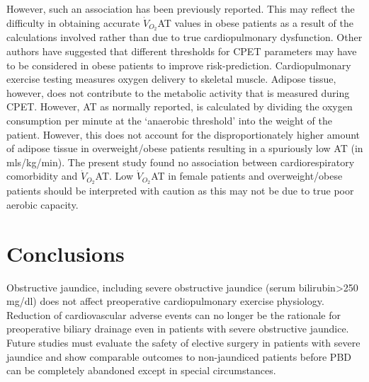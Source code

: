 However, such an association has been previously reported.\parencite{horwich_relationship_2009}  This may reflect the difficulty in obtaining accurate $\dot{V}_{O_2}$AT values in obese patients as a result of the calculations involved rather than due to true cardiopulmonary dysfunction. Other authors have suggested that different thresholds for CPET parameters may have to be considered in obese patients to improve risk-prediction.\parencite{donnelly_criteria_1990,hulens_exercise_2001} Cardiopulmonary exercise testing measures oxygen delivery to skeletal muscle. Adipose tissue, however, does not contribute to the metabolic activity that is measured during CPET. However, AT as normally reported, is calculated by dividing the oxygen consumption per minute at the ‘anaerobic threshold' into the weight of the patient. However, this does not account for the disproportionately higher amount of adipose tissue in overweight/obese patients resulting in a spuriously low AT (in mls/kg/min). The present study found no association between cardiorespiratory comorbidity and $\dot{V}_{O_2}$AT. Low $\dot{V}_{O_2}$AT in female patients and overweight/obese patients should be interpreted with caution as this may not be due to true poor aerobic capacity.

\section{Conclusions}
Obstructive jaundice, including severe obstructive jaundice (serum bilirubin>250 mg/dl) does not affect preoperative cardiopulmonary exercise physiology. Reduction of cardiovascular adverse events can no longer be the rationale for preoperative biliary drainage even in patients with severe obstructive jaundice. Future studies must evaluate the safety of elective surgery in patients with severe jaundice and show comparable outcomes to non-jaundiced patients before PBD can be completely abandoned except in special circumstances.